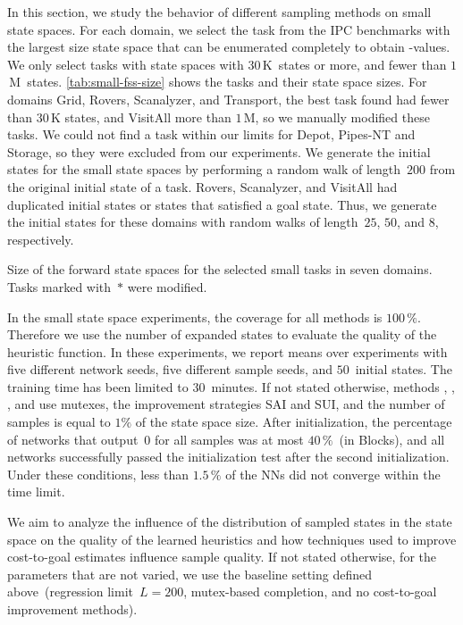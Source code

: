 In this section, we study the behavior of different sampling methods on small state spaces. For each domain, we select the task from the IPC benchmarks with the largest size state space that can be enumerated completely to obtain \hstar-values. We only select tasks with state spaces with $30$\,K~states or more, and fewer than $1$\,M~states. \cref{tab:small-fss-size} shows the tasks and their state space sizes. For domains Grid, Rovers, Scanalyzer, and Transport, the best task found had fewer than $30$\,K states, and VisitAll more than $1$\,M, so we manually modified these tasks. We could not find a task within our limits for Depot, Pipes-NT and Storage, so they were excluded from our experiments. We generate the initial states for the small state spaces by performing a random walk of length~$200$ from the original initial state of a task. Rovers, Scanalyzer, and VisitAll had duplicated initial states or states that satisfied a goal state. Thus, we generate the initial states for these domains with random walks of length~$25$, $50$, and $8$, respectively.

\begin{table}[tb]
    \caption[Size of the forward state spaces for the selected domains.]{Size of the forward state spaces for the selected small tasks in seven domains. Tasks marked with~$*$ were modified.} 
    \label{tab:small-fss-size}
    \addmargin
    \centering
    
\end{table}

In the small state space experiments, the coverage for all methods is $100\,\%$. Therefore we use the number of expanded states to evaluate the quality of the heuristic function. In these experiments, we report means over experiments with five different network seeds, five different sample seeds, and $50$~initial states. The training time has been limited to $30$~minutes. If not stated otherwise, methods \bfs, \dfs, \rw, and \bfsrw use mutexes, the improvement strategies SAI and SUI, and the number of samples is equal to $1\%$ of the state space size. After initialization, the percentage of networks that output~$0$ for all samples was at most $40\,\%$~(in Blocks), and all networks successfully passed the initialization test after the second initialization. Under these conditions, less than $1.5\,\%$ of the NNs did not converge within the time limit.

We aim to analyze the influence of the distribution of sampled states in the state space on the quality of the learned heuristics and how techniques used to improve cost-to-goal estimates influence sample quality. If not stated otherwise, for the parameters that are not varied, we use the baseline setting defined above~(regression limit~$L=200$, mutex-based completion, and no cost-to-goal improvement methods).

